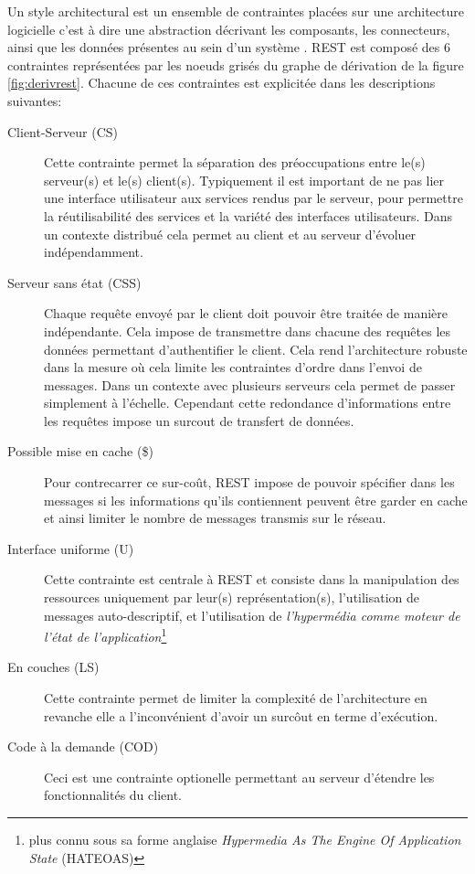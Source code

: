 \documentclass[a4paper, 11pt]{report}
\begin{document}
Un style architectural est un ensemble de contraintes placées sur une
architecture logicielle c'est à dire une abstraction décrivant les
composants, les connecteurs, ainsi que les données présentes au sein
d'un système \cite{perry1992foundations}. REST est composé des 6
contraintes représentées par les noeuds grisés du graphe de dérivation
de la figure \ref{fig:derivrest}. Chacune de ces contraintes est
explicitée dans les descriptions suivantes:

\begin{description}
\item[Client-Serveur (CS)] Cette contrainte permet la séparation des
  préoccupations entre le(s) serveur(s) et le(s) client(s).
  Typiquement il est important de ne pas lier une interface
  utilisateur aux services rendus par le serveur, pour permettre la
  réutilisabilité des services et la variété des interfaces
  utilisateurs. Dans un contexte distribué cela permet au client et
  au serveur d'évoluer indépendamment.

\item[Serveur sans état (CSS)] Chaque requête envoyé par le client
  doit pouvoir être traitée de manière indépendante.  Cela impose de
  transmettre dans chacune des requêtes les données permettant
  d'authentifier le client.  Cela rend l'architecture robuste dans la
  mesure où cela limite les contraintes d'ordre dans l'envoi de
  messages.  Dans un contexte avec plusieurs serveurs cela permet de
  passer simplement à l'échelle.  Cependant cette redondance
  d'informations entre les requêtes impose un surcout de transfert de
  données.

\item [Possible mise en cache (\$)] Pour contrecarrer ce sur-coût,
  REST impose de pouvoir spécifier dans les messages si les
  informations qu'ils contiennent peuvent être garder en cache et
  ainsi limiter le nombre de messages transmis sur le réseau.

\item[Interface uniforme (U)] Cette contrainte est centrale à REST et
  consiste dans la manipulation des ressources uniquement par leur(s)
  représentation(s), l'utilisation de messages auto-descriptif, et
  l'utilisation de \emph{l'hypermédia comme moteur de l'état de
    l'application}\footnote{plus connu sous sa forme anglaise
    \emph{Hypermedia As The Engine Of Application State} (HATEOAS)}

\item[En couches (LS)] Cette contrainte permet de limiter la
  complexité de l'architecture en revanche elle a l'inconvénient
  d'avoir un surcôut en terme d'exécution.

\item[Code à la demande (COD)] Ceci est une contrainte optionelle
  permettant au serveur d'étendre les fonctionnalités du client.
\end{description}
\end{document}
